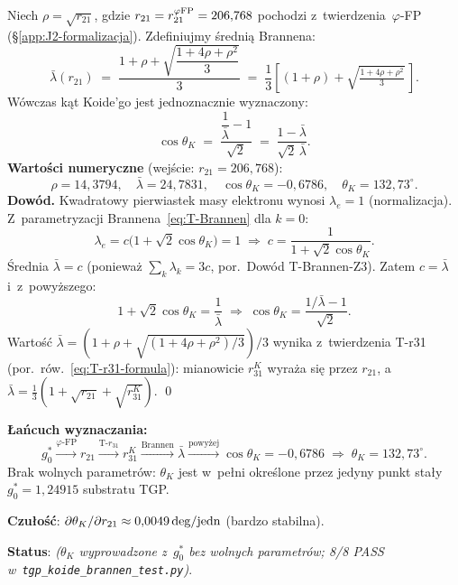 \begin{proposition}[$Q_K = 3/2$ z~symetrii $\mathbb{Z}_3$ --- parametryzacja Brannena]
\begin{proposition}%
\label{prop:T-thetaK-r21}
Niech $\rho = \sqrt{r_{21}}$, gdzie $r_{21} = r_{21}^{\varphi{\rm FP}} = 206{,}768$
pochodzi z~twierdzenia~$\varphi$-FP (\S\ref{app:J2-formalizacja}).
Zdefiniujmy \'sredni\k{a} Brannena:
\begin{equation}\label{eq:T-muBrannen}
  \bar\lambda(r_{21})
  \;=\;
  \frac{1 + \rho + \sqrt{\dfrac{1+4\rho+\rho^2}{3}}}{3}
  \;=\;
  \frac{1}{3}\!\left[(1+\rho) + \sqrt{\tfrac{1+4\rho+\rho^2}{3}}\,\right].
\end{equation}
W\'owczas k\k{a}t Koide'go jest jednoznacznie wyznaczony:
\begin{equation}\label{eq:T-thetaK-from-r21}
  \cos\theta_K
  \;=\;
  \frac{\dfrac{1}{\bar\lambda} - 1}{\sqrt{2}}
  \;=\;
  \frac{1 - \bar\lambda}{\sqrt{2}\,\bar\lambda}.
\end{equation}
\textbf{Warto\'sci numeryczne} (wej\'scie: $r_{21} = 206{,}768$):
\[
  \rho = 14{,}3794,\quad
  \bar\lambda = 24{,}7831,\quad
  \cos\theta_K = -0{,}6786,\quad
  \theta_K = 132{,}73^\circ.
\]
\textbf{Dow\'od.}
Kwadratowy pierwiastek masy elektronu wynosi $\lambda_e = 1$ (normalizacja).
Z~parametryzacji Brannena~\eqref{eq:T-Brannen} dla $k=0$:
\[
  \lambda_e = c\bigl(1 + \sqrt{2}\cos\theta_K\bigr) = 1
  \;\Longrightarrow\;
  c = \frac{1}{1+\sqrt{2}\cos\theta_K}.
\]
\'Srednia $\bar\lambda = c$ (poniewa\.z $\sum_k \lambda_k = 3c$, por.~Dow\'od T-Brannen-Z3).
Zatem $c = \bar\lambda$ i~z~powy\.zszego:
\[
  1 + \sqrt{2}\cos\theta_K = \frac{1}{\bar\lambda}
  \;\Longrightarrow\;
  \cos\theta_K = \frac{1/\bar\lambda - 1}{\sqrt{2}}.
\]
Warto\'s\'c $\bar\lambda = (1 + \rho + \sqrt{(1+4\rho+\rho^2)/3})/3$ wynika
z~twierdzenia T-r31 (por.~r\'ow.~\eqref{eq:T-r31-formula}): mianowicie
$r_{31}^K$ wyra\.za si\k{e} przez $r_{21}$, a~$\bar\lambda = \frac{1}{3}(1 + \sqrt{r_{21}} + \sqrt{r_{31}^K})$. \qed

\medskip
\textbf{\L{}a\'ncuch wyznaczania:}
\[
  g_0^* \xrightarrow{\varphi\text{-FP}} r_{21} \xrightarrow{\text{T-}r_{31}} r_{31}^K
  \xrightarrow{\text{Brannen}} \bar\lambda
  \xrightarrow{\text{powy\.zej}} \cos\theta_K = -0{,}6786
  \;\Longrightarrow\; \theta_K = 132{,}73^\circ.
\]
Brak wolnych parametr\'ow: $\theta_K$ jest w~pe\l{}ni okre\'slone przez
jedyny punkt sta\l{}y $g_0^* = 1{,}24915$ substratu TGP.

\smallskip
\textbf{Czu\l{}o\'s\'c}: $\partial\theta_K/\partial r_{21} \approx 0{,}0049\,{\rm deg}/{\rm jedn}$ (bardzo stabilna).

\textbf{Status}:  \emph{($\theta_K$ wyprowadzone z~$g_0^*$
bez wolnych parametr\'ow; 8/8 PASS w~\texttt{tgp\_koide\_brannen\_test.py})}.
\end{proposition}
\end{proposition}

